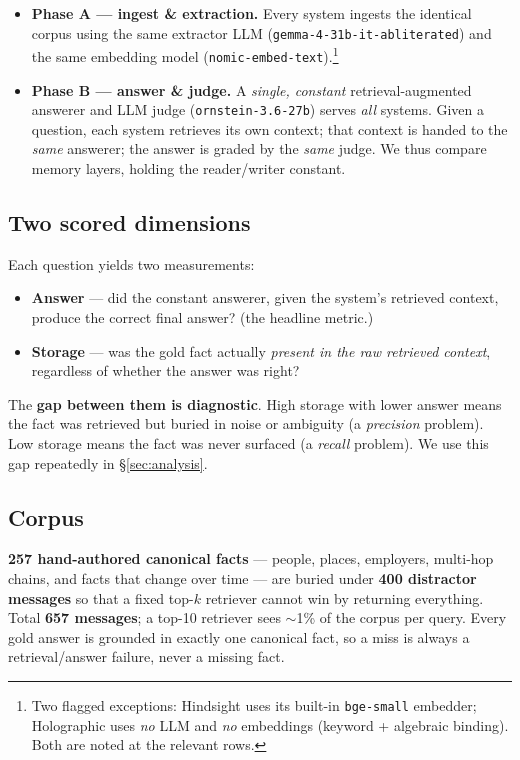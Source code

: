 \documentclass[11pt]{article}
\newcommand{\sapp}{$\sim$}            %
\begin{document}
\begin{itemize}[nosep]
  \item \textbf{Phase A --- ingest \& extraction.} Every system ingests the identical corpus using the same
  extractor LLM (\texttt{gemma-4-31b-it-abliterated}) and the same embedding model
  (\texttt{nomic-embed-text}).\footnote{Two flagged exceptions: Hindsight uses its built-in
  \texttt{bge-small} embedder; Holographic uses \emph{no} LLM and \emph{no} embeddings (keyword + algebraic
  binding). Both are noted at the relevant rows.}
  \item \textbf{Phase B --- answer \& judge.} A \emph{single, constant} retrieval-augmented answerer and LLM
  judge (\texttt{ornstein-3.6-27b}) serves \emph{all} systems. Given a question, each system retrieves its own
  context; that context is handed to the \emph{same} answerer; the answer is graded by the \emph{same} judge.
  We thus compare memory layers, holding the reader/writer constant.
\end{itemize}

\subsection{Two scored dimensions}
Each question yields two measurements:
\begin{itemize}[nosep]
  \item \textbf{Answer} --- did the constant answerer, given the system's retrieved context, produce the
  correct final answer? (the headline metric.)
  \item \textbf{Storage} --- was the gold fact actually \emph{present in the raw retrieved context}, regardless
  of whether the answer was right?
\end{itemize}
The \textbf{gap between them is diagnostic}. High storage with lower answer means the fact was retrieved but
buried in noise or ambiguity (a \emph{precision} problem). Low storage means the fact was never surfaced (a
\emph{recall} problem). We use this gap repeatedly in \S\ref{sec:analysis}.

\subsection{Corpus}
\textbf{257 hand-authored canonical facts} --- people, places, employers, multi-hop chains, and facts that
change over time --- are buried under \textbf{400 distractor messages} so that a fixed top-$k$ retriever cannot
win by returning everything. Total \textbf{657 messages}; a top-10 retriever sees \sapp1\% of the corpus per
query. Every gold answer is grounded in exactly one canonical fact, so a miss is always a retrieval/answer
failure, never a missing fact.
\end{document}
